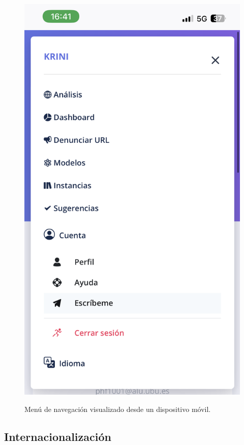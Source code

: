\begin{figure}[h]
	\caption[Manual de usuario: menú (versión móvil)]{Menú de navegación visualizado desde un dispositivo móvil.}
	\centering
	\includegraphics[scale=0.1]{../img/anexos/user_guide/0_menu_mobile}
	\label{e-0:menu-mobile}
\end{figure}

\subsection{Internacionalización}

